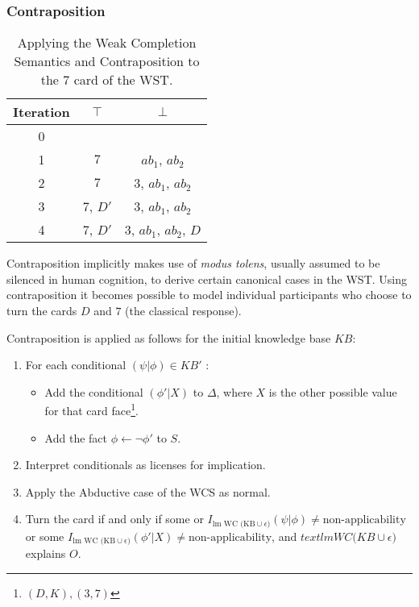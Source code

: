\subsubsection*{Contraposition}
\begin{table}
\begin{center}
\begin{tabular}{ c c c }
 \textbf{Iteration} & \textbf{$\top$} & \textbf{$\bot$} \\ 
 \hline
 0 &  &  \\  
 1 &  $7$ & $ab_1$, $ab_2$  \\  
 2 &  $7$ & $3$, $ab_1$, $ab_2$  \\
 3 &  $7$, $D'$ & $3$, $ab_1$, $ab_2$  \\
 4 &  $7$, $D'$ & $3$, $ab_1$, $ab_2$, $D$  
\end{tabular}
\caption{Applying the Weak Completion Semantics and Contraposition to the $7$ card of the WST.}
\label{tbl:7cont}
\end{center}
\end{table}

Contraposition implicitly makes use of \textit{modus tolens}, usually assumed to be silenced in human cognition, to derive certain canonical cases in the WST. Using contraposition it becomes possible to model individual participants who choose to turn the cards $D$ and $7$ (the classical response).

Contraposition is applied as follows for the initial knowledge base $KB$:
\begin{enumerate}
\item For each conditional $(\psi|\phi)\in KB'$ :
\begin{itemize}
\item Add the conditional $(\phi'|X)$ to $\Delta$, where $X$ is the other possible value for that card face\footnote{$(D,K),(3,7)$}.
\item Add the fact $\phi\leftarrow \lnot \phi'$ to $S$.
\end{itemize}
\item Interpret conditionals as licenses for implication.
\item Apply the Abductive case of the WCS as normal.
\item Turn the card if and only if some or $I_{\text{lm WC (KB} \cup \epsilon)}(\psi|\phi)\neq\textrm{non-applicability}$ or some $I_{\text{lm WC (KB} \cup \epsilon)}(\phi'|X)\neq\textrm{non-applicability}$, and $text{lm WC (KB} \cup \epsilon)$ explains $O$.
\end{enumerate}

